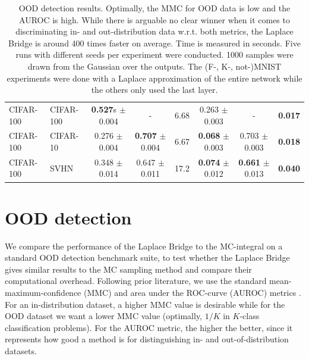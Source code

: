 \begin{table}[h!]
\begin{tabular}{l  l || c c  c | c  c  c}
         \midrule
         CIFAR-100 & CIFAR-100 & \textbf{0.527}s $\pm$ 0.004 & - & 6.68 & 0.263 $\pm$ 0.003 & - & \textbf{0.017} \\
         CIFAR-100 & CIFAR-10 & 0.276 $\pm$ 0.004 & \textbf{0.707} $\pm$ 0.004 & 6.67 & \textbf{0.068} $\pm$ 0.003 & 0.703 $\pm$ 0.003 & \textbf{0.018} \\
         CIFAR-100 & SVHN  & 0.348 $\pm$ 0.014 & 0.647 $\pm$ 0.011 & 17.2 & \textbf{0.074} $\pm$ 0.012 & \textbf{0.661} $\pm$ 0.013 & \textbf{0.040} \\
         \bottomrule
    \end{tabular}
    \caption{OOD detection results. Optimally, the MMC for OOD data is low and the AUROC is high. While there is arguable no clear winner when it comes to discriminating in- and out-distribution data w.r.t. both metrics, the Laplace Bridge is around 400 times faster on average. Time is measured in seconds. Five runs with different seeds per experiment were conducted. 1000 samples were drawn from the Gaussian over the outputs. The (F-, K-, not-)MNIST experiments were done with a Laplace approximation of the entire network while the others only used the last layer.}
    \label{tab:experiments_table}
\end{table}

\vspace{-0.5em}
\section{OOD detection}
\label{subsec:exp2_numbers}

We compare the performance of the Laplace Bridge to the MC-integral on a standard OOD detection benchmark suite, to test whether the Laplace Bridge gives similar results to the MC sampling method and compare their computational overhead. Following prior literature, we use the standard mean-maximum-confidence (MMC) and area under the ROC-curve (AUROC) metrics \citep{HendycksOODBaseline}. For an in-distribution dataset, a higher MMC value is desirable while for the OOD dataset we want a lower MMC value (optimally, $1/K$ in $K$-class classification problems). For the AUROC metric, the higher the better, since it represents how good a method is for distinguishing in- and out-of-distribution datasets.


